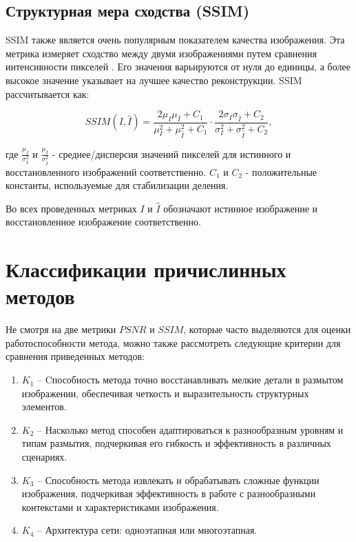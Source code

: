 \subsection{Структурная мера сходства (SSIM)}

SSIM также является очень популярным показателем качества изображения. Эта метрика измеряет сходство между двумя изображениями путем сравнения интенсивности пикселей \cite{wang2004image}. Его значения варьируются от нуля до единицы, а более высокое значение указывает на лучшее качество реконструкции. SSIM рассчитывается как:

\begin{equation}
	SSIM(I, \hat{I}) = \frac{{2\mu_I \mu_{\hat{I}} + C_1}}{{\mu_I^2 + \mu_{\hat{I}}^2 + C_1}} \cdot \frac{2\sigma_I \sigma_{\hat{I}} + C_2}{\sigma_I^2 + \sigma_{\hat{I}}^2 + C_2},
\end{equation}

где \(\frac{\mu_{I}}{\sigma_{I}^2}\) и \(\frac{\mu_{\hat{I}}}{\sigma_{\hat{I}}^2}\) - среднее/дисперсия значений пикселей для истинного и восстановленного изображений соответственно. \(C_1\) и \(C_2\) - положительные константы, используемые для стабилизации деления.

Во всех проведенных метриках \(I\) и \(\hat{I}\) обозначают истинное изображение и восстановленное изображение соответственно.

\section{Классификации причислинных методов}

Не смотря на две метрики \(PSNR\) и \(SSIM\), которые часто выделяются для оценки работоспособности метода, можно также рассмотреть следующие критерии для сравнения приведенных методов:
\begin{enumerate}
	\item \(K_{1}\) -- Cпособность метода точно восстанавливать мелкие детали в размытом изображении, обеспечивая четкость и выразительность структурных элементов.
	\item \(K_{2}\) -- Насколько метод способен адаптироваться к разнообразным уровням и типам размытия, подчеркивая его гибкость и эффективность в различных сценариях.
	\item \(K_{3}\) -- Способность метода извлекать и обрабатывать сложные функции изображения, подчеркивая эффективность в работе с разнообразными контекстами и характеристиками изображения.
	\item \(K_{4}\) -- Архитектура сети: одноэтапная или многоэтапная.
\end{enumerate}

